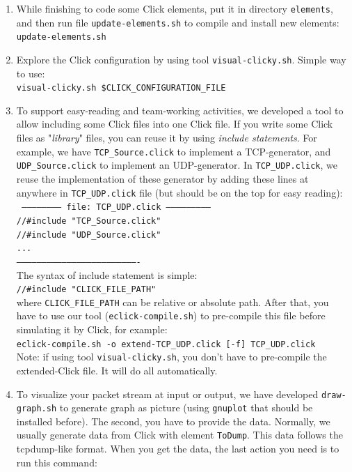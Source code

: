 \documentclass[a4paper]{article}
\begin{document}
\begin{enumerate}
        \item 
          While finishing to code some Click elements, put it in directory \texttt{elements}, and then run file \texttt{update-elements.sh} to compile and install new elements: \\
    \texttt{update-elements.sh}
        \item
        Explore the Click configuration by using tool \texttt{visual-clicky.sh}. Simple way to use: \\    
    \texttt{visual-clicky.sh \$CLICK\_CONFIGURATION\_FILE}
        \item
        To support easy-reading and team-working activities, we developed a tool to allow including some Click files into one Click file. If you write some Click files as "\textit{library}" files, you can reuse it by using \textit{include statements}. For example, we have \texttt{TCP\_Source.click} to implement a TCP-generator, and \texttt{UDP\_Source.click} to implement an UDP-generator. In \texttt{TCP\_UDP.click}, we reuse the implementation of these generator by adding these lines at anywhere in \texttt{TCP\_UDP.click} file (but should be on the top for easy reading): \\
        \texttt{
  ------------------------ file: TCP\_UDP.click ---------------------------\\
  //#include "TCP\_Source.click"\\
  //#include "UDP\_Source.click"\\
  ...\\
  -------------------------------------------------------------------------}\\
  The syntax of include statement is simple:\\
          \texttt{//\#include "CLICK\_FILE\_PATH"}\\
  where \texttt{CLICK\_FILE\_PATH} can be relative or absolute path. After that, you have to use our tool (\texttt{eclick-compile.sh}) to pre-compile this file before simulating it by Click, for example:\\
    \texttt{eclick-compile.sh -o extend-TCP\_UDP.click [-f] TCP\_UDP.click}\\
Note: if using tool \texttt{visual-clicky.sh}, you don't have to pre-compile the extended-Click file. It will do all automatically.
        \item To visualize your packet stream at input or output, we have developed \texttt{draw-graph.sh} to generate graph as picture (using \texttt{gnuplot} that should be installed before). The second, you have to provide the data. Normally, we usually generate data from Click with element \texttt{ToDump}. This data follows the tcpdump-like format. When you get the data, the last action you need is to run this command:\\

\end{enumerate}
\end{document}

